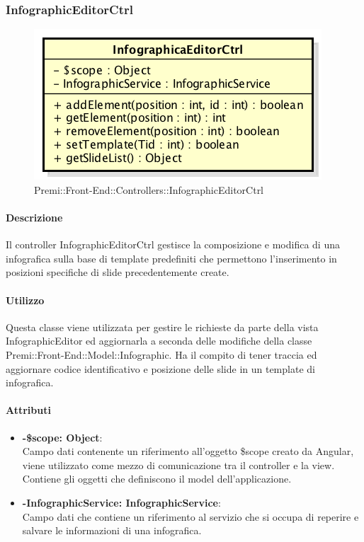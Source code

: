 \newpage
\subsubsection{InfographicEditorCtrl}
\begin{figure}[h]
	\centering
	\includegraphics[width=0.4\linewidth]{img/premi_front_end_controllers_infographiceditorctrl}
	\caption[Premi::Front-End::Controllers::InfographicEditorCtrl]{Premi::Front-End::Controllers::InfographicEditorCtrl}
\end{figure}
	\paragraph{Descrizione}
		Il controller InfographicEditorCtrl gestisce la composizione e modifica di una infografica sulla base di template predefiniti che permettono l'inserimento in posizioni specifiche di slide precedentemente create.
	
	\paragraph{Utilizzo} 
	
		Questa classe viene utilizzata per gestire le richieste da parte della vista InfographicEditor ed aggiornarla a seconda delle modifiche della classe Premi::Front-End::Model::Infographic.
		Ha il compito di tener traccia ed aggiornare codice identificativo e posizione delle slide in un template di infografica.
	\paragraph{Attributi}
	\begin{itemize}
		\item \textbf{-\$scope: Object}:\\
			Campo dati contenente un riferimento all'oggetto \$scope creato da Angular, viene utilizzato come mezzo di comunicazione tra il controller e la view. Contiene gli oggetti che definiscono il model dell'applicazione.
		\item \textbf{-InfographicService: InfographicService}:\\
			Campo dati che contiene un riferimento al servizio che si occupa di reperire e salvare le informazioni di una infografica.
	\end{itemize}
	
